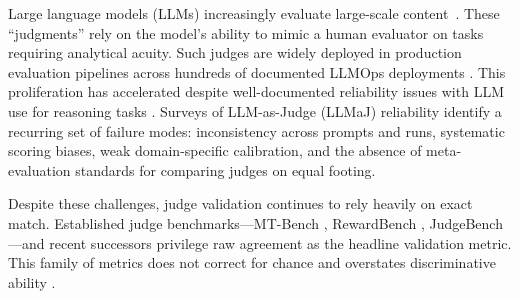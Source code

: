\documentclass[11pt]{article}
\begin{document}
Large language models (LLMs) increasingly evaluate large-scale content~\citep{zheng2023judging}. These ``judgments'' rely on the model's ability to mimic a human evaluator on tasks requiring analytical acuity. Such judges are widely deployed in production evaluation pipelines across hundreds of documented LLMOps deployments \citep{doordash2024autoeval, zenml2025deployments}. This proliferation has accelerated despite well-documented reliability issues with LLM use for reasoning tasks \citep{wang2023large, wu2023style, panickssery2024llm, stureborg2024large, schroeder2024trust, gu2024survey, li2024comprehensive, shi2024judging}. 
Surveys of LLM-as-Judge (LLMaJ) reliability identify a recurring set of failure modes: inconsistency across prompts and runs, systematic scoring biases, weak domain-specific calibration, and the absence of meta-evaluation standards for comparing judges on equal footing.


Despite these challenges, judge validation continues to rely heavily on exact match. Established judge benchmarks---MT-Bench \citep{zheng2023judging}, RewardBench \citep{lambert2024rewardbench}, JudgeBench \citep{tan2025judgebench}---and recent successors \citep{malik2025rewardbench2,whitehouse2025j1,jiang2025codejudgebench} privilege raw agreement as the headline validation metric. This family of metrics does not correct for chance \citep{cohen1960coefficient,hayes2007standard} and overstates discriminative ability \citep{guerdan2025validating,han2025judgesverdict,collot2025balanced}.
\end{document}
